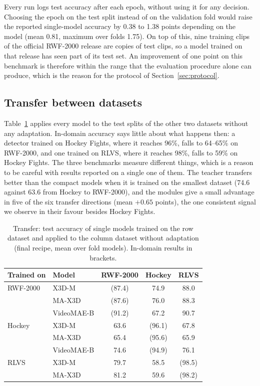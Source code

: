 \documentclass[conference]{IEEEtran}
\begin{document}
Every run logs test accuracy after each epoch, without using it for any
decision. Choosing the epoch on the test split instead of on the
validation fold would raise the reported single-model accuracy by 0.38 to
1.38 points depending on the model (mean 0.81, maximum over folds 1.75).
On top of this, nine training clips of the official RWF-2000 release are
copies of test clips, so a model trained on that release has seen part of
its test set. An improvement of one point on this
benchmark is therefore within the range that the evaluation procedure
alone can produce, which is the reason for the protocol of
Section~\ref{sec:protocol}.

\subsection{Transfer between datasets}
\label{sec:cross}

Table~\ref{tab:cross} applies every model to the test splits of the other
two datasets without any adaptation. In-domain accuracy says little about
what happens then: a detector trained on Hockey Fights, where it reaches
96\%, falls to 64--65\% on RWF-2000, and one trained on RLVS, where it
reaches 98\%, falls to 59\% on Hockey Fights. The three benchmarks measure
different things, which is a reason to be careful with results reported on
a single one of them. The teacher transfers better than the compact models
when it is trained on the smallest dataset (74.6 against 63.6 from Hockey
to RWF-2000), and the modules give a small advantage in five of the six
transfer directions (mean $+0.65$ points), the one consistent signal we
observe in their favour besides Hockey Fights.

\begin{table}[t]
  \centering
  \caption{Transfer: test accuracy of single models trained on the row
  dataset and applied to the column dataset without adaptation (final
  recipe, mean over fold models). In-domain results in brackets.}
  \label{tab:cross}
  \setlength{\tabcolsep}{2.5pt}
  \begin{tabular}{llccc}
    \toprule
    Trained on & Model & RWF-2000 & Hockey & RLVS \\
    \midrule
    RWF-2000 & X3D-M      & (87.4) & 74.9 & 88.0 \\
             & MA-X3D     & (87.6) & 76.0 & 88.3 \\
             & VideoMAE-B & (91.2) & 67.2 & 90.7 \\
    Hockey   & X3D-M      & 63.6 & (96.1) & 67.8 \\
             & MA-X3D     & 65.4 & (95.6) & 65.9 \\
             & VideoMAE-B & 74.6 & (94.9) & 76.1 \\
    RLVS     & X3D-M      & 79.7 & 58.5 & (98.5) \\
             & MA-X3D     & 81.2 & 59.6 & (98.2) \\
    \bottomrule
  \end{tabular}
\end{table}
\end{document}
